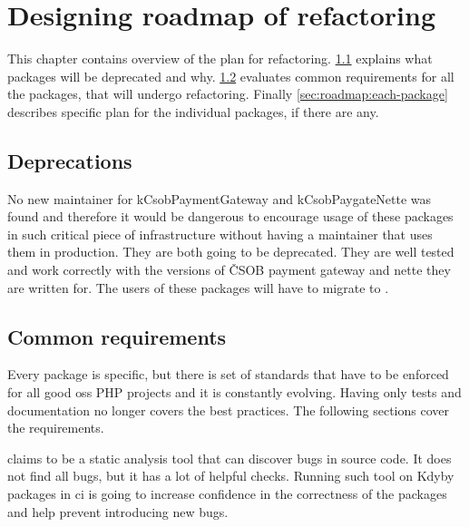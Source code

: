 \chapter{Designing roadmap of refactoring}

This chapter contains overview of the plan for refactoring. \ref{sec:roadmap:deprecations} explains what packages will be deprecated and why. \ref{sec:roadmap:common} evaluates common requirements for all the packages, that will undergo refactoring. Finally \ref{sec:roadmap:each-package} describes specific plan for the individual packages, if there are any.

\section{Deprecations} \label{sec:roadmap:deprecations}

No new maintainer for \gls{kCsobPaymentGateway} and \gls{kCsobPaygateNette} was found and therefore it would be dangerous to encourage usage of these packages in such critical piece of infrastructure without having a maintainer that uses them in production. They are both going to be deprecated. They are well tested and work correctly with the versions of ČSOB payment gateway and \gls{nette} they are written for. The users of these packages will have to migrate to .

\section{Common requirements} \label{sec:roadmap:common}

Every package is specific, but there is set of standards that have to be enforced for all good \gls{oss} PHP projects and it is constantly evolving. Having only tests and documentation no longer covers the best practices. The following sections cover the requirements.


 claims to be a static analysis tool that can discover bugs in source code. It does not find all bugs, but it has a lot of helpful checks. Running such tool on Kdyby packages in \gls{ci} is going to increase confidence in the correctness of the packages and help prevent introducing new bugs.

